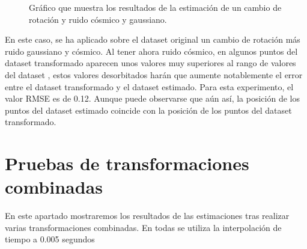 \begin{figure}[H]
\begin{center}
\hspace{0.5cm}

\end{center}

\caption{Gráfico que muestra los resultados de la estimación de un cambio de rotación y ruido cósmico y gaussiano.}
\end{figure}

En este caso, se ha aplicado sobre el dataset original un cambio de rotación más ruido gaussiano y cósmico. Al tener ahora ruido cósmico, en algunos puntos del dataset transformado aparecen unos valores muy superiores al rango de valores del dataset , estos valores desorbitados harán que aumente notablemente el error entre el dataset transformado y el dataset estimado. Para esta experimento, el valor RMSE es de 0.12. Aunque puede observarse que aún así, la posición de los puntos del dataset estimado coincide con la posición de los puntos del dataset transformado.




\section{Pruebas de transformaciones combinadas}

En este apartado mostraremos los resultados de las estimaciones tras realizar varias transformaciones combinadas. En todas se utiliza la interpolación de tiempo a 0.005 segundos



